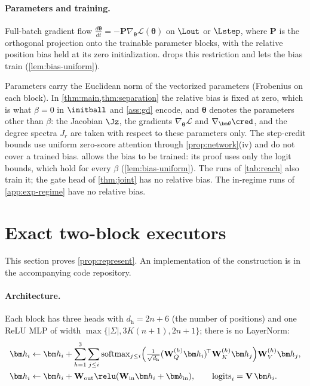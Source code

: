 \paragraph{Parameters and training.}

\begin{assumption}[Training]
\label{ass:gd}
Full-batch gradient flow $\tfrac{d\bm\theta}{dt}=-\mathbf P\nabla_{\bm\theta}\mathcal L(\bm\theta)$ on $\Lout$ or $\Lstep$, where $\mathbf P$ is the orthogonal projection onto
the trainable parameter blocks, with the relative
position bias held at its zero initialization.  drops this restriction and lets the bias train (\cref{lem:bias-uniform}).
\end{assumption}

\label{rem:norms}Parameters carry the Euclidean norm of the vectorized parameters (Frobenius on
each block). In \cref{thm:main,thm:separation} the relative bias is fixed at zero, which is what $\beta=0$ in $\initball$ and
\cref{ass:gd} encode, and $\bm\theta$ denotes the parameters other than $\beta$: the Jacobian $\Jz$, the gradients $\nabla_{\bm\theta}\mathcal L$ and
$\nabla_{\bm\theta}\cred$, and the degree spectra $J_r$ are taken with respect to these parameters only. The step-credit bounds use uniform
zero-score attention through \cref{prop:network}(iv) and do not cover a trained bias.  allows the bias to be
trained: its proof uses only the logit bounds, which hold for every $\beta$ (\cref{lem:bias-uniform}). The runs of \cref{tab:reach} also train it; the gate head of \cref{thm:joint} has no relative bias. The in-regime runs of \cref{app:exp-regime} have no relative bias.


\section{Exact two-block executors}
\label{app:architectures}

This section proves \cref{prop:represent}. An implementation of the construction is in the accompanying code repository.

\paragraph{Architecture.}
\label{app:construction}
\label{app:model}
Each block has three heads with $d_{\mathrm h}=2n+6$ (the number of positions) and one ReLU MLP of width $\max\{|\Sigma|,3K(n+1),2n+1\}$;
there is no LayerNorm:
\begin{align*}
 \bm h_i&\leftarrow \bm h_i+\sum_{h=1}^{3}\sum_{j\le i}\operatorname{softmax}_{j\le i}\Bigl(\tfrac{1}{\sqrt{d_{\mathrm h}}}(\mathbf W^{(h)}_Q\bm h_i)^{\!\top}\mathbf W^{(h)}_K\bm h_j\Bigr)\mathbf W^{(h)}_V\bm h_j,\\
 \bm h_i&\leftarrow \bm h_i+\mathbf W_{\mathrm{out}}\relu(\mathbf W_{\mathrm{in}}\bm h_i+\bm b_{\mathrm{in}}),\qquad \mathrm{logits}_i=\mathbf V\,\bm h_i .
\end{align*}

